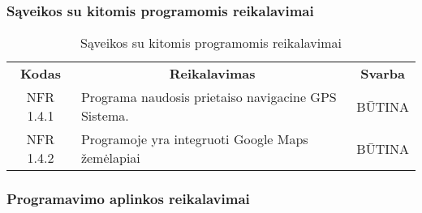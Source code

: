 \documentclass{VUMIFPSkursinis}
\begin{document}
\pagebreak

\subsubsection{Sąveikos su kitomis programomis reikalavimai}

\begin{center}
	\begin{table}[H]
	\begin{tabular}{|p{2cm}|p{}|p{}|}
	\hline
	    \rowcolor{lightgray}
		\multicolumn{3}{|c|}{Sąveikos su kitomis programomis reikalavimai}\\
		
	\hline
		\multicolumn{1}{|c|}{{\bfseries Kodas}}&
		\multicolumn{1}{|c|}{{\bfseries Reikalavimas}}&
		\multicolumn{1}{|c|}{{\bfseries Svarba}}\\
	\hline 	
		\multicolumn{1}{|c|}{NFR 1.4.1}&
		{Programa naudosis prietaiso navigacine GPS Sistema.}&
		\multicolumn{1}{|c|}{BŪTINA}\\	
	
	\hline 	
		\multicolumn{1}{|c|}{NFR 1.4.2}&
		{Programoje yra integruoti Google Maps žemėlapiai}&
		\multicolumn{1}{|c|}{BŪTINA}\\	
	
	\hline 	 	 	
	\end{tabular}
	\caption{Sąveikos su kitomis programomis reikalavimai}
	\label{table:Sąveikossukitomisprogramomisreikalavimai}
	\end{table}

\end{center}

\subsubsection{Programavimo aplinkos reikalavimai}
\end{document}
